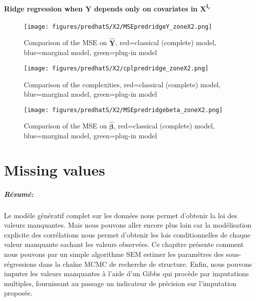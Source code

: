 \documentclass[12pt,a4paper]{report}
\begin{document}
\subsubsection{Ridge regression when $\boldsymbol{Y}$ depends only on covariates in $\boldsymbol{X^{I_r}}$}

\begin{figure}[h!]
	\centering
		  \texttt{[image: figures/predhatS/X2/MSEpredridgeY\_zoneX2.png]}
		\caption{Comparison of the MSE on $\hat{\boldsymbol{Y}}$, red=classical (complete) model, blue=marginal model, green=plug-in model}\label{MSEpredridgeY_zoneX2}
	\end{figure}
	\begin{figure}[h!]
	\centering
		  \texttt{[image: figures/predhatS/X2/cplpredridge\_zoneX2.png]}
		\caption{Comparison of the complexities, red=classical (complete) model, blue=marginal model, green=plug-in model}\label{cplpredridge_zoneX2}
	\end{figure}
	\begin{figure}[h!]
	\centering
		  \texttt{[image: figures/predhatS/X2/MSEpredridgebeta\_zoneX2.png]}
		\caption{Comparison of the MSE on $\hat{\boldsymbol{\beta}}$, red=classical (complete) model, blue=marginal model, green=plug-in model}\label{MSEpredridgebeta_zoneX2}
	\end{figure}
	\FloatBarrier

\FloatBarrier

\chapter{Missing values} \label{chapmiss}
	\paragraph{Résumé:} Le modèle génératif complet sur les données nous permet d'obtenir la loi des valeurs manquantes. Mais nous pouvons aller encore plus loin car la modélisation explicite des corrélations nous permet d'obtenir les lois conditionnelles de chaque valeur manquante sachant les valeurs observées. Ce chapitre présente comment nous pouvons par un simple algorithme SEM estimer les paramètres des sous-régressions dans la chaîne MCMC de recherche de structure. Enfin, nous pouvons imputer les valeurs manquantes à l'aide d'un Gibbs qui procède par imputations multiples, fournissant au passage un indicateur de précision sur l'imputation proposée. 
\end{document}
